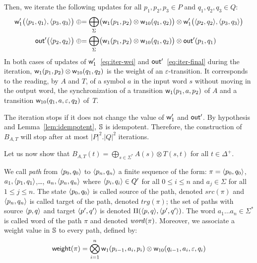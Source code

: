 \noindent
Then, we iterate the following updates for all $p_1, p_2, p_3\in P$ 
and $q_1, q_2, q_3 \in Q$:
%
\begin{align}
\wei'_1\bigl( \< p_1, q_1>, \< p_3, q_3>\bigr) & \opluseq 
\bigoplus_\Sigma \bigl(\wei_{1}(p_1, p_2) \otimes \wei_{10}(q_1, q_2)\bigr)
\otimes \wei'_1\bigl( \< p_2, q_2>, \< p_3, q_3>\bigr) \label{eq:iter-wei}\\
%
\final'\bigl(\<p_2, q_2>\bigr) & \opluseq 
\bigoplus_\Sigma \bigl(\wei_{1}(p_1, p_2)\otimes \wei_{10}(q_1, q_2)\bigr)
\otimes \final'(p_1, q_1) \label{eq:iter-final}
\end{align}
%
In both cases of updates of $\mathsf{w}'_1$~\eqref{eq:iter-wei}
and $\mathsf{out}'$~\eqref{eq:iter-final} during the iteration, 
$\mathsf{w}_{1}(p_1, p_2) \otimes \mathsf{w}_{10}(q_1, q_2)$ 
is the weight of an $\varepsilon$-transition.
It corresponds to the reading, by $A$ and $T$, 
of a symbol $a$ in the input word $s$ without moving in the output word,
\ie the synchronization of 
a transition $\mathsf{w}_{1}(p_1, a, p_2)$ of $A$ and 
a transition $\mathsf{w}_{10}(q_1, a, \varepsilon, q_2)$ of~$T$.

The iteration stops if it does not change the value of $\mathsf{w}'_1$ and $\mathsf{out}'$.
By hypothesis and Lemma~\ref{lem:idempotent}, 
$\mathbb{S}$ is idempotent. 
Therefore, the construction of $B_{A, T}$ will stop after 
at most $|P|^2 . |Q|^2$ iterations.

\smallskip
Let us now show that 
$B_{A, T}(t) = \displaystyle\bigoplus_{s\in \Sigma^*} A(s) \otimes T(s, t)$
for all $t\in \Delta^+$.

\noindent
We call \emph{path} from $\< p_0, q_0>$ to $\< p_n, q_n>$ 
a finite sequence of the form:
$\pi = \< p_0, q_0>$, $a_1, \< p_1, q_1>$,\ldots, $a_n, \< p_n, q_n>$
where $\< p_i, q_i> \in Q'$ for all $0 \leq i \leq n$
and $a_j \in \Sigma$ for all $1 \leq j \leq n$.
The state $\< p_0, q_0>$ is called source of the path, denoted $\mathit{src}(\pi)$
and $\< p_n, q_n>$ is called target of the path, denoted $\mathit{trg}(\pi)$;
the set of paths with source $\< p, q>$ and target $\< p', q'>$ 
is denoted $\Pi(\< p, q>, \< p', q'>)$.
The word $a_1\ldots a_n \in \Sigma^*$ is called word of the path $\pi$
and denoted $\mathit{word}(\pi)$.
Moreover, we associate a weight value in $\mathbb{S}$ to every path, 
defined by:
\begin{equation} \label{def:weight-path}
\mathsf{weight}(\pi) = \bigotimes_{i = 1}^{n} 
\mathsf{w}_1(p_{i-1}, a_i, p_i) \otimes
\mathsf{w}_{10}(q_{i-1}, a_i, \varepsilon, q_i)
\end{equation}

